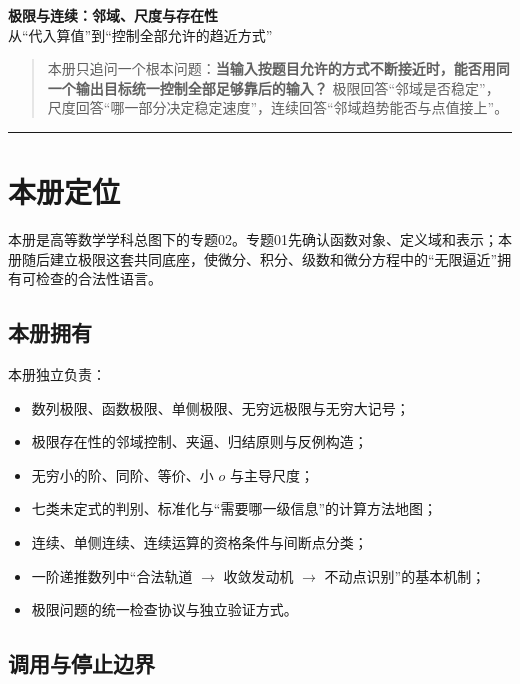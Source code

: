 \documentclass[11pt,a4paper]{ctexart}
\begin{document}
\begin{center}
{\LARGE\textbf{极限与连续：邻域、尺度与存在性}}\\[0.4em]
{\large 从“代入算值”到“控制全部允许的趋近方式”}
\end{center}
\vspace{0.5em}

\begin{quote}
本册只追问一个根本问题：\textbf{当输入按题目允许的方式不断接近时，能否用同一个输出目标统一控制全部足够靠后的输入？} 极限回答“邻域是否稳定”，尺度回答“哪一部分决定稳定速度”，连续回答“邻域趋势能否与点值接上”。
\end{quote}

\begin{center}\rule{0.5\linewidth}{0.5pt}\end{center}

\setcounter{section}{-1}
\section{本册定位}

本册是高等数学学科总图下的专题02。专题01先确认函数对象、定义域和表示；本册随后建立极限这套共同底座，使微分、积分、级数和微分方程中的“无限逼近”拥有可检查的合法性语言。

\subsection{本册拥有}

本册独立负责：
\begin{itemize}
  \item 数列极限、函数极限、单侧极限、无穷远极限与无穷大记号；
  \item 极限存在性的邻域控制、夹逼、归结原则与反例构造；
  \item 无穷小的阶、同阶、等价、小 $o$ 与主导尺度；
  \item 七类未定式的判别、标准化与“需要哪一级信息”的计算方法地图；
  \item 连续、单侧连续、连续运算的资格条件与间断点分类；
  \item 一阶递推数列中“合法轨道 $\to$ 收敛发动机 $\to$ 不动点识别”的基本机制；
  \item 极限问题的统一检查协议与独立验证方式。
\end{itemize}

\subsection{调用与停止边界}
\end{document}
